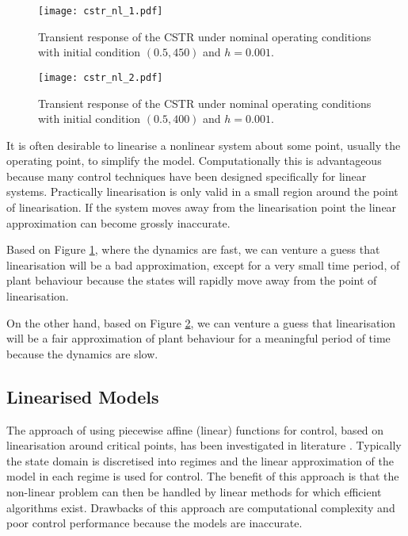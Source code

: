\begin{figure}[H] 
\centering
\texttt{[image: cstr\_nl\_1.pdf]}
\caption{Transient response of the CSTR under nominal operating conditions with initial condition $(0.5, 450)$ and $h=0.001$.}
\label{fig_cstr_nl_1}
\end{figure}
\begin{figure}[H] 
\centering
\texttt{[image: cstr\_nl\_2.pdf]}
\caption{Transient response of the CSTR under nominal operating conditions with initial condition $(0.5, 400)$ and $h=0.001$.}
\label{fig_cstr_nl_2}
\end{figure}
It is often desirable to linearise a nonlinear system about some point, usually the operating point, to simplify the model. Computationally this is advantageous because many control techniques have been designed specifically for linear systems. Practically linearisation is only valid in a small region around the point of linearisation. If the system moves away from the linearisation point the linear approximation can become grossly inaccurate. 

Based on Figure \ref{fig_cstr_nl_1}, where the dynamics are fast, we can venture a guess that linearisation will be a bad approximation, except for a very small time period, of plant behaviour because the states will rapidly move away from the point of linearisation.

On the other hand, based on Figure \ref{fig_cstr_nl_2}, we can venture a guess that linearisation will be a fair approximation of plant behaviour for a meaningful period of time because the dynamics are slow.

\subsection{Linearised Models}
The approach of using piecewise affine (linear) functions for control, based on linearisation around critical points, has been investigated in literature \cite{du}\cite{kvasnica}. Typically the state domain is discretised into regimes and the linear approximation of the model in each regime is used for control. The benefit of this approach is that the non-linear problem  can then be handled by linear methods for which efficient algorithms exist. Drawbacks of this approach are computational complexity \cite{du} and poor control performance because the models are inaccurate.

